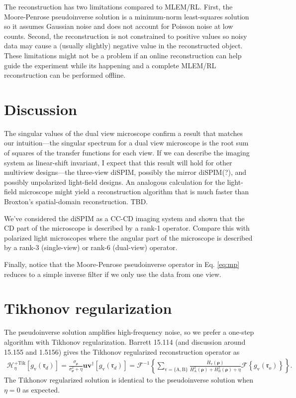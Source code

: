 \documentclass[11pt]{article}
\providecommand{\mb}[1]{\mathbf{#1}}
\providecommand{\mc}[1]{\mathcal{#1}}
\providecommand{\ro}[1]{\mathbf{\mathfrak{r}}_o}
\providecommand{\rd}[1]{\mathbf{\mathfrak{r}}_d}
\providecommand{\bs}[1]{\boldsymbol{#1}}
\begin{document}
The reconstruction has two limitations compared to MLEM/RL. First, the
Moore-Penrose pseudoinverse solution is a minimum-norm least-squares solution so
it assumes Gaussian noise and does not account for Poisson noise at low counts.
Second, the reconstruction is not constrained to positive values so noisy data
may cause a (usually slightly) negative value in the reconstructed object. These
limitations might not be a problem if an online reconstruction can help guide
the experiment while its happening and a complete MLEM/RL reconstruction can be
performed offline.

\section{Discussion}
The singular values of the dual view microscope confirm a result that matches
our intuition---the singular spectrum for a dual view microscope is the root sum
of squares of the transfer functions for each view. If we can describe the
imaging system as linear-shift invariant, I expect that this result will hold
for other multiview designs---the three-view diSPIM, possibly the mirror
diSPIM(?), and possibly unpolarized light-field designs. An analogous
calculation for the light-field microscope might yield a reconstruction
algorithm that is much faster than Broxton's spatial-domain reconstruction. TBD.
 
We've considered the diSPIM as a CC-CD imaging system and shown that the CD part
of the microscope is described by a rank-1 operator. Compare this with polarized
light microscopes where the angular part of the microscope is described by a
rank-3 (single-view) or rank-6 (dual-view) operator.

Finally, notice that the Moore-Penrose pseudoinverse operator in Eq.
\ref{eq:mp} reduces to a simple inverse filter if we only use the data from one
view.

\section{Tikhonov regularization}
The pseudoinverse solution amplifies high-frequency noise, so we prefer a
one-step algorithm with Tikhonov regularization. Barrett 15.114 (and discussion
around 15.155 and 1.5156) gives the Tikhonov regularized reconstruction operator
as
\begin{align}
  \mc{H}^{+\text{Tik}}_{\eta}[g_{\text{v}}(\rd{})] = \frac{\sigma_{\bs{\rho}}}{\sigma^2_{\bs{\rho}} + \eta}\mb{u}\mb{v}^{\dagger}[g_{\text{v}}(\rd{})] = \mc{F}^{-1}\left\{\sum_{\text{v} = \{\text{A}, \text{B}\}}\frac{H_{\text{v}}(\bs{\rho})}{H_{\text{A}}^2(\bs{\rho}) + H_{\text{B}}^2(\bs{\rho}) + \eta}\mc{F}\left\{g_{\text{v}}(\ro{})\right\}\right\}.
\end{align}
The Tikhonov regularized solution is identical to the pseudoinverse solution when $\eta = 0$ as expected. 
\end{document}
